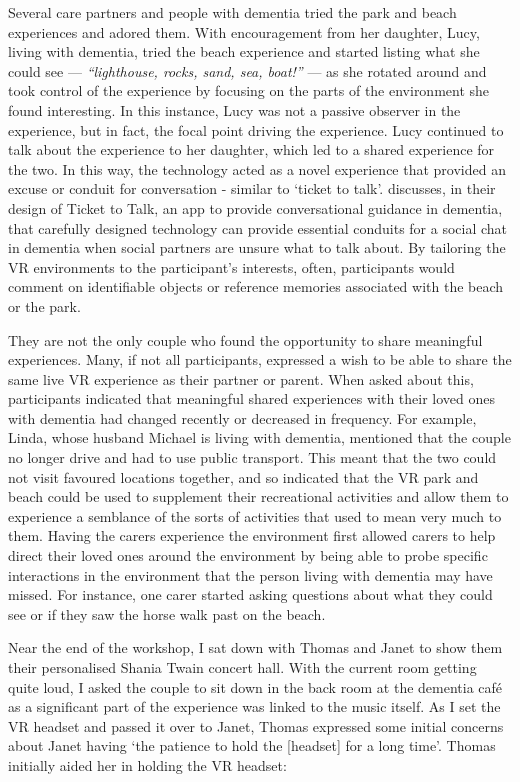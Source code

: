 Several care partners and people with dementia tried the park and beach experiences and adored them. With encouragement from her daughter, Lucy, living with dementia, tried the beach experience and started listing what she could see — \textit{``lighthouse, rocks, sand, sea, boat!''} — as she rotated around and took control of the experience by focusing on the parts of the environment she found interesting. In this instance, Lucy was not a passive observer in the experience, but in fact, the focal point driving the experience. Lucy continued to talk about the experience to her daughter, which led to a shared experience for the two. In this way, the technology acted as a novel experience that provided an excuse or conduit for conversation - similar to `ticket to talk'. \cite{welsh_ticket_2018} discusses, in their design of Ticket to Talk, an app to provide conversational guidance in dementia, that carefully designed technology can provide essential conduits for a social chat in dementia when social partners are unsure what to talk about. By tailoring the VR environments to the participant's interests, often, participants would comment on identifiable objects or reference memories associated with the beach or the park.

They are not the only couple who found the opportunity to share meaningful experiences. Many, if not all participants, expressed a wish to be able to share the same live VR experience as their partner or parent. When asked about this, participants indicated that meaningful shared experiences with their loved ones with dementia had changed recently or decreased in frequency. For example, Linda, whose husband Michael is living with dementia, mentioned that the couple no longer drive and had to use public transport. This meant that the two could not visit favoured locations together, and so indicated that the VR park and beach could be used to supplement their recreational activities and allow them to experience a semblance of the sorts of activities that used to mean very much to them. Having the carers experience the environment first allowed carers to help direct their loved ones around the environment by being able to probe specific interactions in the environment that the person living with dementia may have missed. For instance, one carer started asking questions about what they could see or if they saw the horse walk past on the beach. 

Near the end of the workshop, I sat down with Thomas and Janet to show them their personalised Shania Twain concert hall. With the current room getting quite loud, I asked the couple to sit down in the back room at the dementia café as a significant part of the experience was linked to the music itself. As I set the VR headset and passed it over to Janet, Thomas expressed some initial concerns about Janet having ‘the patience to hold the [headset] for a long time’. Thomas initially aided her in holding the VR headset:

